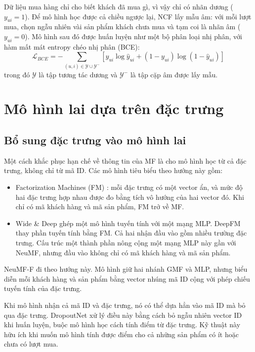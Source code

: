 Dữ liệu mua hàng chỉ cho biết khách đã mua gì, vì vậy chỉ có nhãn dương ($y_{ui} = 1$). Để mô hình học được cả chiều ngược lại, NCF lấy mẫu âm: với mỗi lượt mua, chọn ngẫu nhiên vài sản phẩm khách chưa mua và tạm coi là nhãn âm ($y_{ui} = 0$). Mô hình sau đó được huấn luyện như một bộ phân loại nhị phân, với hàm mất mát entropy chéo nhị phân (BCE):
\begin{equation*}
    \mathcal{L}_{BCE} = -\sum_{(u, i) \in \mathcal{Y} \cup \mathcal{Y}^-} \left[ y_{ui} \log \hat{y}_{ui} + (1 - y_{ui}) \log (1 - \hat{y}_{ui}) \right]
\end{equation*}
trong đó $\mathcal{Y}$ là tập tương tác dương và $\mathcal{Y}^-$ là tập cặp âm được lấy mẫu.

\section{Mô hình lai dựa trên đặc trưng}
\label{sec:modern_trends}

\subsection{Bổ sung đặc trưng vào mô hình lai}
\label{subsec:deep_ctr}

Một cách khắc phục hạn chế về thông tin của MF là cho mô hình học từ cả đặc trưng, không chỉ từ mã ID. Các mô hình tiêu biểu theo hướng này gồm:
\begin{itemize}
    \item Factorization Machines (FM) \parencite{rendle2010fm}: mỗi đặc trưng có một vector ẩn, và mức độ hai đặc trưng hợp nhau được đo bằng tích vô hướng của hai vector đó. Khi chỉ có mã khách hàng và mã sản phẩm, FM trở về MF.
    \item Wide \& Deep \parencite{cheng2016wide} ghép một mô hình tuyến tính với một mạng MLP. DeepFM \parencite{guo2017deepfm} thay phần tuyến tính bằng FM. Cả hai nhận đầu vào gồm nhiều trường đặc trưng. Cấu trúc một thành phần nông cộng một mạng MLP này gần với NeuMF, nhưng đầu vào không chỉ có mã khách hàng và mã sản phẩm.
\end{itemize}

NeuMF-F đi theo hướng này. Mô hình giữ hai nhánh GMF và MLP, nhưng biểu diễn mỗi khách hàng và sản phẩm bằng vector nhúng mã ID cộng với phép chiếu tuyến tính của đặc trưng.

Khi mô hình nhận cả mã ID và đặc trưng, nó có thể dựa hẳn vào mã ID mà bỏ qua đặc trưng. DropoutNet \parencite{volkovs2017dropoutnet} xử lý điều này bằng cách bỏ ngẫu nhiên vector ID khi huấn luyện, buộc mô hình học cách tính điểm từ đặc trưng. Kỹ thuật này hữu ích khi muốn mô hình tính được điểm cho cả những sản phẩm có ít hoặc chưa có lượt mua.

